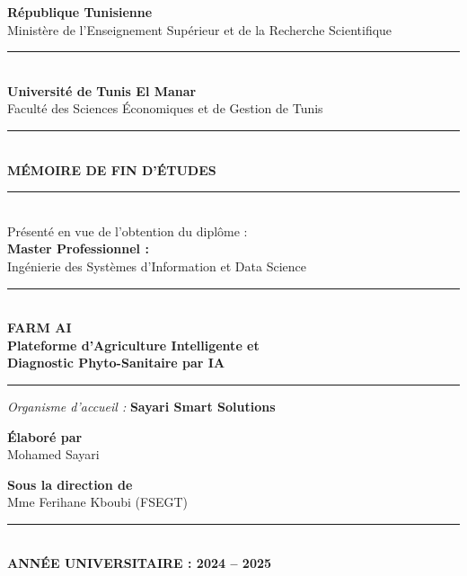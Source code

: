 \documentclass[12pt,a4paper,oneside]{report}
\renewcommand{\headrulewidth}{0.4pt}
\begin{document}
\fancypagestyle{plain}{%
  \fancyhf{}
  \fancyfoot[C]{\thepage}
  \renewcommand{\headrulewidth}{0pt}
}

\begin{titlepage}
\centering
{\large\textbf{République Tunisienne}}\\[0.3cm]
{\large Ministère de l'Enseignement Supérieur et de la Recherche Scientifique}\\[0.5cm]
\rule{\linewidth}{0.5pt}\\[0.3cm]
{\large\textbf{Université de Tunis El Manar}}\\[0.2cm]
{\large Faculté des Sciences Économiques et de Gestion de Tunis}\\[0.8cm]

\rule{\linewidth}{1.5pt}\\[0.5cm]
{\LARGE\bfseries MÉMOIRE DE FIN D'ÉTUDES}\\[0.3cm]
\rule{\linewidth}{1.5pt}\\[0.5cm]

{\large Présenté en vue de l'obtention du diplôme :}\\[0.3cm]
{\large\bfseries Master Professionnel :}\\
{\large Ingénierie des Systèmes d'Information et Data Science}\\[1cm]

\begin{center}
  \rule{0.8\linewidth}{0.4pt}\\[0.3cm]
  {\Huge\bfseries\color{green!40!black}
    FARM AI\\[0.3cm]
    Plateforme d'Agriculture Intelligente et\\[0.3cm]
    Diagnostic Phyto-Sanitaire par IA}\\[0.3cm]
  \rule{0.8\linewidth}{0.4pt}
\end{center}

\vspace{0.8cm}
{\large\textit{Organisme d'accueil :} \textbf{Sayari Smart Solutions}}\\[1.2cm]

\begin{minipage}{0.45\textwidth}
  \centering
  {\large\textbf{Élaboré par}}\\[0.3cm]
  {\large Mohamed Sayari}
\end{minipage}
\hfill
\begin{minipage}{0.45\textwidth}
  \centering
  {\large\textbf{Sous la direction de}}\\[0.3cm]
  {\large Mme Ferihane Kboubi (FSEGT)}\\
\end{minipage}

\vfill
\rule{\linewidth}{0.5pt}\\[0.3cm]
{\large\textbf{ANNÉE UNIVERSITAIRE : 2024 -- 2025}}
\end{titlepage}
\end{document}

